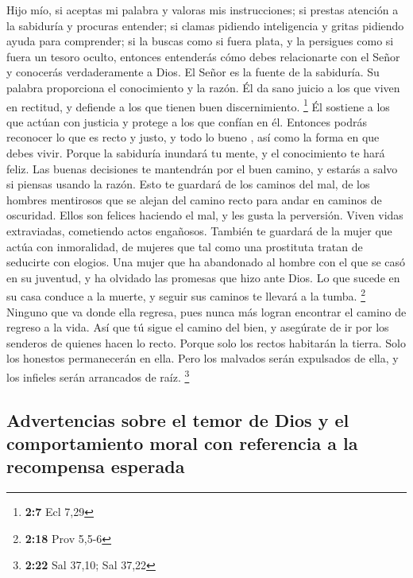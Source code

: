  Hijo mío, si aceptas mi palabra y valoras mis
instrucciones;  si prestas atención a la sabiduría y
procuras entender;  si clamas pidiendo inteligencia y gritas
pidiendo ayuda para comprender;  si la buscas como si fuera
plata, y la persigues como si fuera un tesoro oculto, 
entonces entenderás cómo debes relacionarte con el Señor y conocerás
verdaderamente a Dios.  El Señor es la fuente de la
sabiduría. Su palabra proporciona el conocimiento y la razón.
 Él da sano juicio a los que viven en rectitud, y defiende a
los que tienen buen discernimiento. \footnote{\textbf{2:7} Ecl 7,29}
 Él sostiene a los que actúan con justicia y protege a los
que confían en él.  Entonces podrás reconocer lo que es
recto y justo, y todo lo bueno , así como la forma en que debes vivir.
 Porque la sabiduría inundará tu mente, y el conocimiento
te hará feliz.  Las buenas decisiones te mantendrán por el
buen camino, y estarás a salvo si piensas usando la razón. 
Esto te guardará de los caminos del mal, de los hombres mentirosos
 que se alejan del camino recto para andar en caminos de
oscuridad.  Ellos son felices haciendo el mal, y les gusta
la perversión.  Viven vidas extraviadas, cometiendo actos
engañosos.  También te guardará de la mujer que actúa con
inmoralidad, de mujeres que tal como una prostituta tratan de seducirte
con elogios.  Una mujer que ha abandonado al hombre con el
que se casó en su juventud, y ha olvidado las promesas que hizo ante
Dios.  Lo que sucede en su casa conduce a la muerte, y
seguir sus caminos te llevará a la tumba. \footnote{\textbf{2:18} Prov
  5,5-6}  Ninguno que va donde ella regresa, pues nunca más
logran encontrar el camino de regreso a la vida.  Así que
tú sigue el camino del bien, y asegúrate de ir por los senderos de
quienes hacen lo recto.  Porque solo los rectos habitarán
la tierra. Solo los honestos permanecerán en ella.  Pero
los malvados serán expulsados de ella, y los infieles serán arrancados
de raíz. \footnote{\textbf{2:22} Sal 37,10; Sal 37,22}

\hypertarget{advertencias-sobre-el-temor-de-dios-y-el-comportamiento-moral-con-referencia-a-la-recompensa-esperada}{%
\subsection{Advertencias sobre el temor de Dios y el comportamiento
moral con referencia a la recompensa
esperada}\label{advertencias-sobre-el-temor-de-dios-y-el-comportamiento-moral-con-referencia-a-la-recompensa-esperada}}

